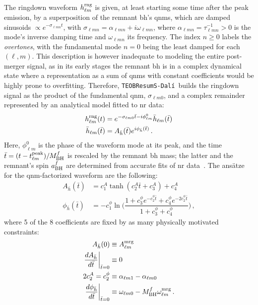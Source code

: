 \documentclass[prd,amssymb,amsmath,amsfonts,nofootinbib,reprint,showpacs,longbibliography]{revtex4-1}
\def\mbhf{M_{\rm BH}^f}
\def\abhf{a_{\rm BH}^f}
\newcommand{\dali}[0]{\texttt{TEOBResumS-Dalí}}
\begin{document}
The ringdown waveform $h_{\ell m}^{\rm rng}$ is given, at least starting some time after the peak emission,
by a superposition of the remnant \ac{bh}'s \acp{qnm}, which are damped sinusoids $\propto e^{-\sigma_{\ell m n} t}$,
with $\sigma_{\ell m n} = \alpha_{\ell m n} + i \omega_{\ell m n}$, where $\alpha_{\ell m n} = \tau_{\ell m n}^{-1} > 0$
is the mode's inverse damping time and $\omega_{\ell m n}$ its frequency. The index $n \geq 0$ labels the
\textit{overtones}, with the fundamental mode $n = 0$ being the least damped for each $(\ell, m)$.
This description is however inadequate to modeling the entire post-merger signal, as in its early stages
the remnant \ac{bh} is in a complex dynamical state where a representation as a sum of \acp{qnm}
with constant coefficients would be highly prone to overfitting. Therefore, \dali~builds the ringdown
signal as the product of the fundamental \ac{qnm}, $\sigma_{\ell m 0}$, and a complex remainder
represented by an analytical model fitted to \ac{nr} data:
\begin{subequations}
\begin{align}
    h_{\ell m}^{\rm rng}(t) &= e^{-\sigma_{\ell m 0} \bar{t} - i \phi_{\ell m}^0} \bar{h}_{\ell m} (\bar{t}) \\
    \bar{h}_{\ell m} (\bar{t}) &= A_{\bar{h}} (\bar{t}) e^{i \phi_{\bar{h}}(\bar{t})}\, .
\end{align}
\end{subequations}
Here, $\phi_{\ell m}^0$ is the phase of the waveform mode at its peak, and the time $\bar{t} =
(t - t_{\ell m}^{\rm peak})/\mbhf$ is rescaled by the remnant \ac{bh} mass; the latter and the
remnant's spin $\abhf$ are determined from accurate fits of \ac{nr} data~\cite{Jimenez-Forteza:2016oae}.
The ansätze for the \ac{qnm}-factorized waveform are the following:
\begin{subequations}
\begin{align}
    A_{\bar{h}} (\bar{t}) &= c_1^A \tanh (c_2^A \bar{t} + c_3^A) + c_4^A \\
    \phi_{\bar{h}} (\bar{t}) &= -c_1^\phi \ln \biggl(\dfrac{1 + c_3^\phi e^{-c_2^\phi \bar{t}} + c_4^\phi e^{-2c_2^\phi \bar{t}}}{1 + c_3^\phi + c_4^\phi}\biggr)\, ,
\end{align}
\end{subequations}
where 5 of the 8 coefficients are fixed by as many physically motivated constraints:
\begin{subequations}
    \begin{align}
        A_{\bar{h}}(0) &\equiv A_{\ell m}^{\rm mrg} \label{eq:amrg}\\
        \dfrac{dA_{\bar{h}}}{d \bar{t}} \biggl\vert_{\bar{t} = 0} &\equiv 0 \\
        2c_2^A = c_2^\phi &\equiv \alpha_{\ell m 1} - \alpha_{\ell m 0} \label{eq:alpha21}\\
        \dfrac{d \phi_{\bar{h}}}{d \bar{t}} \biggl\vert_{\bar{t} = 0} &\equiv \omega_{\ell m 0} - \mbhf \omega_{\ell m}^{\rm mrg}\, . \label{eq:omgmrg}
    \end{align}
\end{subequations}
\end{document}
